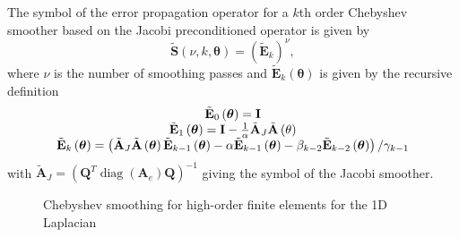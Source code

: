 \documentclass[review]{siamart190516}
\DeclareMathOperator{\diag}{diag}
\begin{document}
\begin{definition}\label{def:chebyshev_symbol}
The symbol of the error propagation operator for a $k$th order Chebyshev smoother based on the Jacobi preconditioned operator is given by
\begin{equation}
\tilde{\mathbf{S}} \left( \nu, k, \boldsymbol{\theta} \right) = \left( \tilde{\mathbf{E}}_k \right)^\nu,
\end{equation}
where $\nu$ is the number of smoothing passes and $\tilde{\mathbf{E}}_k \left( \mathbf{\boldsymbol{\theta}} \right)$ is given by the recursive definition
\begin{equation}
\begin{tabular}{c}
$\tilde{\mathbf{E}}_0 \left( \boldsymbol{\theta} \right) = \mathbf{I}$\\
$\tilde{\mathbf{E}}_1 \left( \boldsymbol{\theta} \right) = \mathbf{I} - \frac{1}{\alpha} \tilde{\mathbf{A}}_J \tilde{\mathbf{A}} \left( \mathbf{\theta} \right)$\\
$\tilde{\mathbf{E}}_k \left( \boldsymbol{\theta} \right) = \left( \tilde{\mathbf{A}}_J \tilde{\mathbf{A}} \left( \boldsymbol{\theta} \right) \tilde{\mathbf{E}}_{k - 1} \left( \boldsymbol{\theta} \right) - \alpha \tilde{\mathbf{E}}_{k - 1} \left( \boldsymbol{\theta} \right) - \beta_{k - 2} \tilde{\mathbf{E}}_{k - 2} \left( \boldsymbol{\theta} \right) \right) / \gamma_{k - 1}$
\end{tabular}
\end{equation}
with $\tilde{\mathbf{A}}_J = \left( \mathbf{Q}^T \diag \left( \mathbf{A}_e \right) \mathbf{Q} \right)^{-1}$ giving the symbol of the Jacobi smoother.
\end{definition}

\begin{figure}[!tbp]
  \centering
  \hfill
  \caption{Chebyshev smoothing for high-order finite elements for the 1D Laplacian}
\end{figure}
\end{document}
